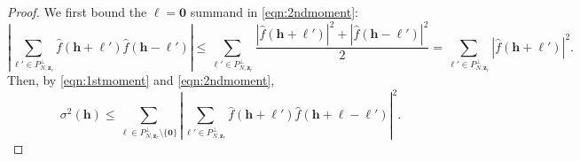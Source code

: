 \documentclass[a4paper,11pt]{article}
\newcommand{\bszero}{\boldsymbol{0}}
\newcommand{\bsh}{\boldsymbol{h}}
\newcommand{\bsl}{\boldsymbol{\ell}}
\newcommand{\abs}[1]{\left\vert#1\right\vert}
\begin{document}
\begin{proof}
    We first bound the $\bsl = \bszero$ summand in \eqref{eqn:2ndmoment}:
    \[
    \left|\sum_{\bsl'\in P_{N,\boldsymbol{z}_r}^\perp}\widehat{f}(\bsh+\bsl')\widehat{f}(\bsh-\bsl')\right|\leq \sum_{\bsl'\in P_{N,\boldsymbol{z}_r}^\perp}\frac{|\widehat{f}(\bsh+\bsl')|^2+|\widehat{f}(\bsh-\bsl')|^2}{2}=\sum_{\bsl' \in P_{N,\boldsymbol{z}_r}^\perp}|\widehat{f}(\bsh+\bsl')|^2.
    \]
    Then, by \eqref{eqn:1stmoment} and \eqref{eqn:2ndmoment},
    \begin{equation}\label{eqn:varbound}
        \sigma^2(\bsh)
    \leq \sum_{\bsl \in P_{N,\boldsymbol{z}_r}^\perp\setminus \{\bszero\}}\abs{\sum_{\bsl'\in P_{N,\boldsymbol{z}_r}^\perp}\widehat{f}(\bsh+\bsl')\widehat{f}(\bsh+\bsl-\bsl')}^2.
    \end{equation}
    

\end{proof}
\end{document}
